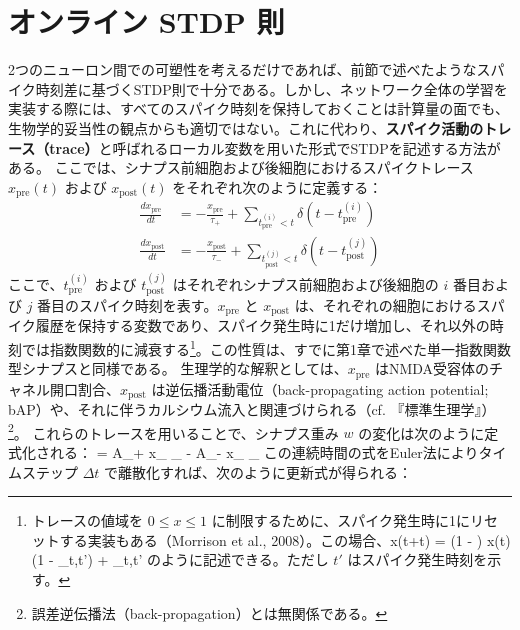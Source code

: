 \section{オンライン STDP 則}
2つのニューロン間での可塑性を考えるだけであれば、前節で述べたようなスパイク時刻差に基づくSTDP則で十分である。しかし、ネットワーク全体の学習を実装する際には、すべてのスパイク時刻を保持しておくことは計算量の面でも、生物学的妥当性の観点からも適切ではない。これに代わり、\textbf{スパイク活動のトレース（trace）}と呼ばれるローカル変数を用いた形式でSTDPを記述する方法がある。
ここでは、シナプス前細胞および後細胞におけるスパイクトレース $x_{\text{pre}}(t)$ および $x_{\text{post}}(t)$ をそれぞれ次のように定義する：
\begin{align}
\frac{dx_\text{pre}}{dt} &= -\frac{x_\text{pre}}{\tau_+} + \sum_{t_{\text{pre}}^{(i)} < t} \delta \left(t - t_{\text{pre}}^{(i)}\right) \\
\frac{dx_\text{post}}{dt} &= -\frac{x_\text{post}}{\tau_-} + \sum_{t_{\text{post}}^{(j)} < t} \delta \left(t - t_{\text{post}}^{(j)}\right)
\end{align}
ここで、$t_{\text{pre}}^{(i)}$ および $t_{\text{post}}^{(j)}$ はそれぞれシナプス前細胞および後細胞の $i$ 番目および $j$ 番目のスパイク時刻を表す。$x_\text{pre}$ と $x_\text{post}$ は、それぞれの細胞におけるスパイク履歴を保持する変数であり、スパイク発生時に1だけ増加し、それ以外の時刻では指数関数的に減衰する\footnote{トレースの値域を $0 \leq x \leq 1$ に制限するために、スパイク発生時に1にリセットする実装もある（Morrison et al., 2008）。この場合、x(t+\Delta t) = \left(1 - \right) x(t)\cdot(1 - \delta_{t,t'}) + \delta_{t,t'} のように記述できる。ただし $t'$ はスパイク発生時刻を示す。}。この性質は、すでに第1章で述べた単一指数関数型シナプスと同様である。
生理学的な解釈としては、$x_\text{pre}$ はNMDA受容体のチャネル開口割合、$x_\text{post}$ は逆伝播活動電位（back-propagating action potential; bAP）や、それに伴うカルシウム流入と関連づけられる（cf. 『標準生理学』）\footnote{誤差逆伝播法（back-propagation）とは無関係である。}。
これらのトレースを用いることで、シナプス重み $w$ の変化は次のように定式化される：
 = A_+ x_{} \cdot {}_{} - A_- x_{} \cdot {}_{}
この連続時間の式をEuler法によりタイムステップ $\Delta t$ で離散化すれば、次のように更新式が得られる：
